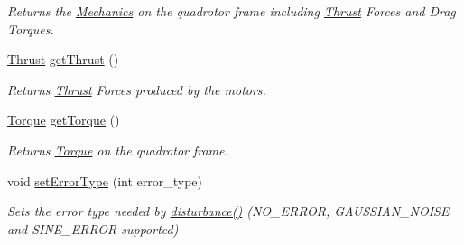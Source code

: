 \begin{DoxyCompactItemize}
\begin{DoxyCompactList}\small\item\em \-Returns the \hyperlink{classMechanics}{\-Mechanics} on the quadrotor frame including \hyperlink{classThrust}{\-Thrust} \-Forces and \-Drag \-Torques. \end{DoxyCompactList}\item 
\hypertarget{classQuadRotorDynamics_a63b315a9a66707236a8780a9229fd63c}{\hyperlink{classThrust}{\-Thrust} \hyperlink{classQuadRotorDynamics_a63b315a9a66707236a8780a9229fd63c}{get\-Thrust} ()}\label{classQuadRotorDynamics_a63b315a9a66707236a8780a9229fd63c}

\begin{DoxyCompactList}\small\item\em \-Returns \hyperlink{classThrust}{\-Thrust} \-Forces produced by the motors. \end{DoxyCompactList}\item 
\hypertarget{classQuadRotorDynamics_aaa0be18d7a8b9244ce57292c60d74698}{\hyperlink{classTorque}{\-Torque} \hyperlink{classQuadRotorDynamics_aaa0be18d7a8b9244ce57292c60d74698}{get\-Torque} ()}\label{classQuadRotorDynamics_aaa0be18d7a8b9244ce57292c60d74698}

\begin{DoxyCompactList}\small\item\em \-Returns \hyperlink{classTorque}{\-Torque} on the quadrotor frame. \end{DoxyCompactList}\item 
\hypertarget{classQuadRotorDynamics_adec8d18d4ce8bad0197501773fa7e6ea}{void \hyperlink{classQuadRotorDynamics_adec8d18d4ce8bad0197501773fa7e6ea}{set\-Error\-Type} (int error\-\_\-type)}\label{classQuadRotorDynamics_adec8d18d4ce8bad0197501773fa7e6ea}

\begin{DoxyCompactList}\small\item\em \-Sets the error type needed by \hyperlink{classQuadRotorDynamics_a78d2bfe2469d1fd447b486ebf6a3fd64}{disturbance()} (\-N\-O\-\_\-\-E\-R\-R\-O\-R, \-G\-A\-U\-S\-S\-I\-A\-N\-\_\-\-N\-O\-I\-S\-E and \-S\-I\-N\-E\-\_\-\-E\-R\-R\-O\-R supported) \end{DoxyCompactList}\end{DoxyCompactItemize}
